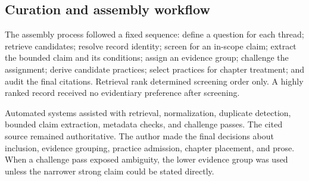 \hypertarget{curation-and-assembly-workflow}{%
\subsection{Curation and assembly workflow}\label{curation-and-assembly-workflow}}

The assembly process followed a fixed sequence: define a question for each thread; retrieve candidates; resolve record identity; screen for an in-scope claim; extract the bounded claim and its conditions; assign an evidence group; challenge the assignment; derive candidate practices; select practices for chapter treatment; and audit the final citations. Retrieval rank determined screening order only. A highly ranked record received no evidentiary preference after screening.

Automated systems assisted with retrieval, normalization, duplicate detection, bounded claim extraction, metadata checks, and challenge passes. The cited source remained authoritative. The author made the final decisions about inclusion, evidence grouping, practice admission, chapter placement, and prose. When a challenge pass exposed ambiguity, the lower evidence group was used unless the narrower strong claim could be stated directly.

